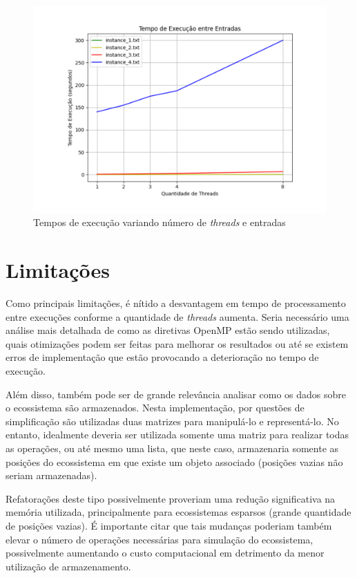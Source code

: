 \documentclass[a4paper, 12pt]{article}
\begin{document}
\vspace*{-1cm}
\begin{figure}[H]
    \centering
    \includegraphics[width=1.1\textwidth]{Images/parallel.pdf}
    \vspace*{-1.5cm}
    \caption{Tempos de execução variando número de \emph{threads} e entradas}
    \label{fig:map6}
\end{figure}

\section{Limitações}

Como principais limitações, é nítido a desvantagem em tempo de processamento entre execuções conforme a quantidade de \emph{threads} aumenta. Seria necessário uma análise mais detalhada de como as diretivas OpenMP estão sendo utilizadas, quais otimizações podem ser feitas para melhorar os resultados ou até se existem erros de implementação que estão provocando a deterioração no tempo de execução.

Além disso, também pode ser de grande relevância analisar como os dados sobre o ecossistema são armazenados. Nesta implementação, por questões de simplificação são utilizadas duas matrizes para manipulá-lo e representá-lo. No entanto, idealmente deveria ser utilizada somente uma matriz para realizar todas as operações, ou até mesmo uma lista, que neste caso, armazenaria somente as posições do ecossistema em que existe um objeto associado (posições vazias não seriam armazenadas).

Refatorações deste tipo possivelmente proveriam uma redução significativa na memória utilizada, principalmente para ecossistemas esparsos (grande quantidade de posições vazias). É importante citar que tais mudanças poderiam também elevar o número de operações necessárias para simulação do ecossistema, possivelmente aumentando o custo computacional em detrimento da menor utilização de armazenamento.
\end{document}

